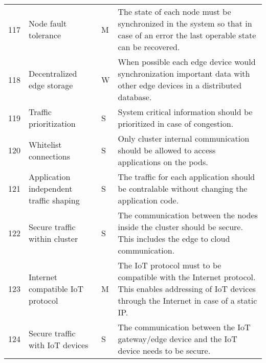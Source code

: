 \begin{longtable}{l p{3cm} p{0.8cm} p{8.5cm} }
117                     & Node fault tolerance                    & M      & The state of each node must be synchronized in the system so that in case of an error the last operable state can be recovered.                                                                                                     \\
118                     & Decentralized edge storage              & W      & When possible each edge device would synchronization important data with other edge devices in a distributed database.                                                                                                              \\
119                     & Traffic prioritization                  & S      & System critical information should be prioritized in case of congestion.                                                                                                                                                            \\
120                     & Whitelist connections                   & S      & Only cluster internal communication should be allowed to access applications on the pods.                                                                                                                                           \\
121                     & Application independent traffic shaping & S      & The traffic for each application should be contralable without changing the application code.                                                                                                                                       \\
122                     & Secure traffic within cluster           & S      & The communication between the nodes inside the cluster should be secure. This includes the edge to cloud communication.                                                                                                             \\
123                     & Internet compatible IoT protocol        & M      & The IoT protocol must to be compatible with the Internet protocol. This enables addressing of IoT devices through the Internet in case of a static IP.                                                                              \\
124                     & Secure traffic with IoT devices         & S      & The communication between the IoT gateway/edge device and the IoT device needs to be secure.                                                                                                                                        \\

\end{longtable}
